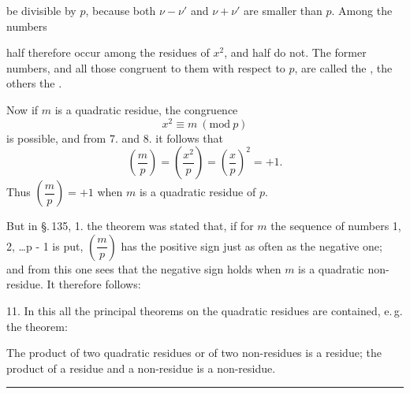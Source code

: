 be divisible by $p$, because both $\nu - \nu'$ and $\nu + \nu'$ are smaller than
$p$. Among the numbers


half therefore occur among the residues of $x^2$, and half do not.
The former numbers, and all those congruent to them with respect to $p$,
are called the , the others the
.

Now if $m$ is a quadratic residue, the congruence
\[
x^2 \equiv m \ (\mathrm{mod}\ p)
\]
is possible, and from 7. and 8. it follows that
\[
\left(\frac{m}{p}\right) = \left(\frac{x^2}{p}\right) = \left(\frac{x}{p}\right)^2 = +1.
\]
Thus $\left(\dfrac{m}{p}\right) = +1$ when $m$ is a quadratic residue of
$p$.

But in \S.\,135, 1. the theorem was stated that, if for $m$ the
sequence of numbers 1, 2, \ldots p - 1 is put,
$\left(\dfrac{m}{p}\right)$ has the positive sign just as often as the
negative one; and from this one sees that the negative sign holds
when $m$ is a quadratic non-residue. It therefore follows:

11. 
In this all the principal theorems on the quadratic residues
are contained, e.\,g. the theorem:

The product of two quadratic residues or of two non-residues
is a residue; the product of a residue and a non-residue is
a non-residue.

\begin{center}
\rule{0.25\linewidth}{0.4pt}
\end{center}
